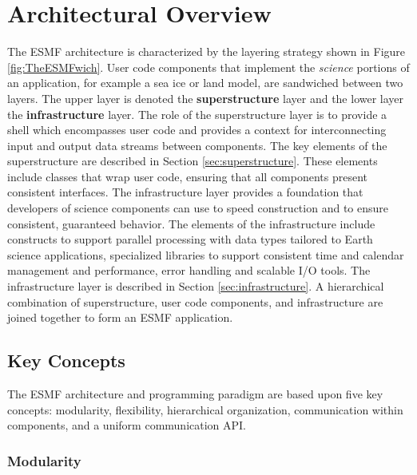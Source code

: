 
\section{Architectural Overview}
\label{sec:ArchOver}
The ESMF architecture is characterized by the layering strategy shown in 
Figure \ref{fig:TheESMFwich}. User code components that implement the 
{\it science} portions of an application, for example a sea ice or land model, 
are sandwiched between two layers. The upper layer is denoted the 
{\bf superstructure} layer and the lower layer the {\bf infrastructure} layer. 
The role of the superstructure layer is to provide a shell which encompasses 
user code and provides a context for interconnecting input and output data 
streams between components. The key elements of the superstructure are described 
in Section \ref{sec:superstructure}.  These elements include classes that wrap 
user code, ensuring that all components present consistent interfaces. The 
infrastructure layer provides a foundation that developers of science components 
can use to speed construction and to ensure consistent, guaranteed behavior.
The elements of the infrastructure include constructs to support parallel 
processing with data types tailored to Earth science applications, specialized 
libraries to support consistent time and calendar management and performance, 
error handling and scalable I/O tools. The infrastructure layer is described in 
Section \ref{sec:infrastructure}.
A hierarchical combination of superstructure, user code components, and 
infrastructure are joined together to form an ESMF application.

\subsection{Key Concepts}
 
The ESMF architecture and programming paradigm are based upon 
five key concepts:  modularity, flexibility, hierarchical 
organization, communication within components, and a uniform 
communication API.  

\subsubsection{Modularity}

